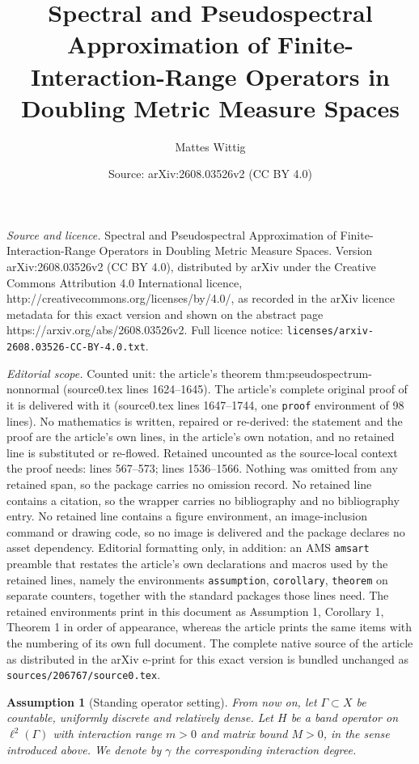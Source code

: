 \documentclass[10pt,a4paper]{amsart}
\title{Spectral and Pseudospectral Approximation of Finite-Interaction-Range Operators in Doubling Metric Measure Spaces}
\author{Mattes Wittig}
\date{Source: arXiv:2608.03526v2 (CC BY 4.0)}
\newtheorem{assumption}{Assumption}
\begin{document}
\maketitle

\noindent\emph{Source and licence.} Spectral and Pseudospectral Approximation of Finite-Interaction-Range Operators in Doubling Metric Measure Spaces. Version arXiv:2608.03526v2 (CC BY 4.0), distributed by arXiv under the Creative Commons Attribution 4.0 International licence, http://creativecommons.org/licenses/by/4.0/, as recorded in the arXiv licence metadata for this exact version and shown on the abstract page https://arxiv.org/abs/2608.03526v2. Full licence notice: \texttt{licenses/arxiv-2608.03526-CC-BY-4.0.txt}.\par\smallskip

\noindent\textit{Editorial scope.} Counted unit: the article's theorem thm:pseudospectrum-nonnormal (source0.tex lines 1624--1645). The article's complete original proof of it is delivered with it (source0.tex lines 1647--1744, one \texttt{proof} environment of 98 lines). No mathematics is written, repaired or re-derived: the statement and the proof are the article's own lines, in the article's own notation, and no retained line is substituted or re-flowed.  Retained uncounted as the source-local context the proof needs: lines 567--573; lines 1536--1566.  Nothing was omitted from any retained span, so the package carries no omission record.  No retained line contains a citation, so the wrapper carries no bibliography and no bibliography entry.  No retained line contains a figure environment, an image-inclusion command or drawing code, so no image is delivered and the package declares no asset dependency.  Editorial formatting only, in addition: an AMS \texttt{amsart} preamble that restates the article's own declarations and macros used by the retained lines, namely the environments \texttt{assumption}, \texttt{corollary}, \texttt{theorem} on separate counters, together with the standard packages those lines need.  The retained environments print in this document as Assumption 1, Corollary 1, Theorem 1 in order of appearance, whereas the article prints the same items with the numbering of its own full document.  The complete native source of the article as distributed in the arXiv e-print for this exact version is bundled unchanged as \texttt{sources/206767/source0.tex}.
\begin{assumption}[Standing operator setting]\label{ass:operators}
From now on, let $\Gamma\subset X$ be
countable, uniformly discrete and relatively dense. Let
$H$ be a band operator on $\ell^2(\Gamma)$ with interaction range
$m>0$ and matrix bound $M>0$, in the sense introduced above. We denote by
$\gamma$ the corresponding interaction degree.
\end{assumption}
\end{document}
